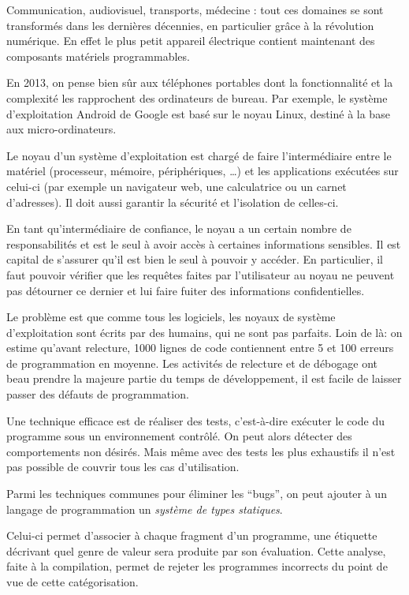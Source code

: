 Communication,
audiovisuel,
transports,
médecine :
tout ces domaines se sont transformés dans les dernières décennies,
en particulier grâce à la révolution numérique.
En effet le plus petit appareil électrique contient maintenant des composants
matériels programmables.


En 2013, on pense bien sûr aux téléphones portables dont la fonctionnalité et la
complexité les rapprochent des ordinateurs de bureau. Par exemple, le système
d'exploitation Android de Google est basé sur le noyau Linux, destiné à la base
aux micro-ordinateurs.

Le noyau d'un système d'exploitation est chargé de faire l'intermédiaire entre
le matériel (processeur, mémoire, périphériques, …) et les applications
exécutées sur celui-ci (par exemple un navigateur web, une calculatrice ou un
carnet d'adresses). Il doit aussi garantir la sécurité et l'isolation de
celles-ci.

En tant qu'intermédiaire de confiance, le noyau a un certain nombre de
responsabilités et est le seul à avoir accès à certaines informations sensibles.
Il est capital de s'assurer qu'il est bien le seul à pouvoir y accéder. En
particulier, il faut pouvoir vérifier que les requêtes faites par l'utilisateur
au noyau ne peuvent pas détourner ce dernier et lui faire fuiter des
informations confidentielles.

Le problème est que comme tous les logiciels, les noyaux de système
d'exploitation sont écrits par des humains, qui ne sont pas parfaits. Loin de
là: on estime qu'avant relecture, 1000 lignes de code contiennent entre 5 et 100
erreurs de programmation en moyenne.
Les activités de relecture et de
débogage ont beau prendre la majeure partie du temps de développement, il est
facile de laisser passer des défauts de programmation.

Une technique efficace est de réaliser des tests, c'est-à-dire exécuter le code
du programme sous un environnement contrôlé. On peut alors détecter des
comportements non désirés. Mais même avec des tests les plus exhaustifs il n'est
pas possible de couvrir tous les cas d'utilisation.

Parmi les techniques communes pour éliminer les ``bugs'', on peut ajouter à un
langage de programmation un \emph{système de types statiques}.

Celui-ci permet d'associer à chaque fragment d'un programme, une étiquette
décrivant quel genre de valeur sera produite par son évaluation. Cette analyse,
faite à la compilation, permet de rejeter les programmes incorrects du point de
vue de cette catégorisation.

